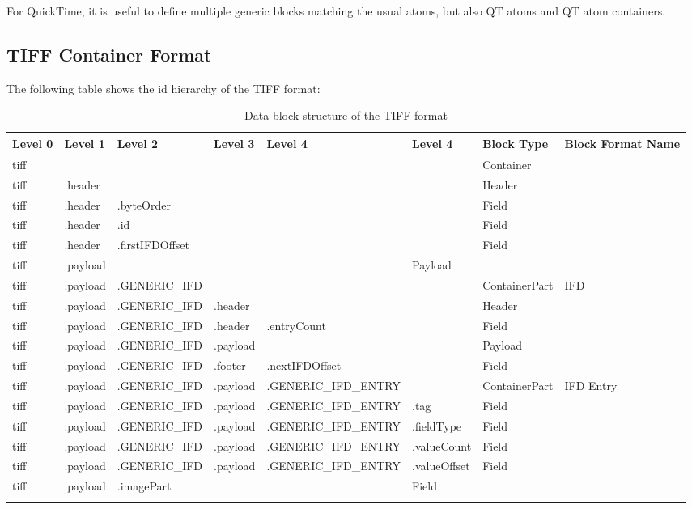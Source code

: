 
For QuickTime, it is useful to define multiple generic blocks matching the usual atoms, but also QT atoms and QT atom containers.


\subsection{TIFF Container Format}
\label{sec:TIFFContainerFormats}

The following table shows the id hierarchy of the TIFF format:

\begin{longtable}{|p{}|p{}|p{}|p{}|p{}|p{}|p{}|p{}|}
	\hline
	Level 0 & Level 1 & Level 2 & Level 3 & Level 4 & Level 4 & Block Type & Block Format Name\\
	\endhead
	\hline
 	tiff & & & & & & Container & \\
	\hline
 	tiff & .header & & & & & Header & \\
	\hline
 	tiff & .header & .byteOrder & & & & Field & \\
	\hline
 	tiff & .header & .id & & & & Field & \\
	\hline
 	tiff & .header & .firstIFDOffset & & & & Field & \\
	\hline
 	tiff & .payload & & & & Payload & \\
	\hline
 	tiff & .payload & .GENERIC_IFD & & & & ContainerPart & IFD\\
	\hline
 	tiff & .payload & .GENERIC_IFD & .header & & & Header & \\
	\hline
 	tiff & .payload & .GENERIC_IFD & .header & .entryCount & & Field & \\
	\hline
 	tiff & .payload & .GENERIC_IFD & .payload & & & Payload & \\
	\hline
 	tiff & .payload & .GENERIC_IFD & .footer & .nextIFDOffset & & Field & \\
	\hline
 	tiff & .payload & .GENERIC_IFD & .payload & .GENERIC_IFD_ENTRY & & ContainerPart & IFD Entry\\
	\hline
 	tiff & .payload & .GENERIC_IFD & .payload & .GENERIC_IFD_ENTRY & .tag & Field & \\
	\hline
 	tiff & .payload & .GENERIC_IFD & .payload & .GENERIC_IFD_ENTRY & .fieldType & Field & \\
	\hline
 	tiff & .payload & .GENERIC_IFD & .payload & .GENERIC_IFD_ENTRY & .valueCount & Field & \\
	\hline
 	tiff & .payload & .GENERIC_IFD & .payload & .GENERIC_IFD_ENTRY & .valueOffset & Field & \\
	\hline
 	tiff & .payload & .imagePart & & & Field & \\
	\hline
	\caption{Data block structure of the TIFF format}
	\label{tab:DatablockstructureoftheTIFFformats}
\end{longtable}

